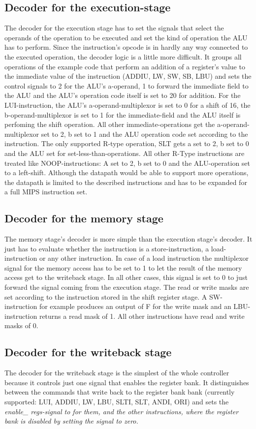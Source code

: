 \subsection{Decoder for the execution-stage}
The decoder for the execution stage has to set the signals that select the operands of the operation to be executed and set the kind of operation the ALU has to perform. Since the instruction's opcode is in hardly any way connected to the executed operation, the decoder logic is a little more difficult. It groups all operations of the example code that perform an addition of a register's value to the immediate value of the instruction (ADDIU, LW, SW, SB, LBU) and sets the control signals to 2 for the ALU's a-operand, 1 to forward the immediate field to the ALU and the ALU's operation code itself is set to 20 for addition. For the LUI-instruction, the ALU's a-operand-multiplexor is set to 0 for a shift of 16, the b-operand-multiplexor is set to 1 for the immediate-field and the ALU itself is perfoming the shift operation. All other immediate-operations get the a-operand-multiplexor set to 2, b set to 1 and the ALU operation code set according to the instruction. The only supported R-type operation, SLT gets a set to 2, b set to 0 and the ALU set for set-less-than-operations. All other R-Type instructions are treated like NOOP-instructions: A set to 2, b set to 0 and the ALU-operation set to a left-shift. Although the datapath would be able to support more operations, the datapath is limited to the described instructions and has to be expanded for a full MIPS instruction set.
\subsection{Decoder for the memory stage}
The memory stage's decoder is more simple than the execution stage's decoder. It just has to evaluate whether the instruction is a store-instruction, a load-instruction or any other instruction. In case of a load instruction the multiplexor signal for the memory access has to be set to 1 to let the result of the memory access get to the writeback stage. In all other cases, this signal is set to 0 to just forward the signal coming from the execution stage. The read or write masks are set according to the instruction stored in the shift register stage. A SW-instruction for example produces an output of F for the write mask and an LBU-instruction returns a read mask of 1. All other instructions have read and write masks of 0.
\subsection{Decoder for the writeback stage}
The decoder for the writeback stage is the simplest of the whole controller because it controls just one signal that enables the register bank. It distinguishes between the commands that write back to the register bank bank (currently supported: LUI, ADDIU, LW, LBU, SLTI, SLT, ANDI, ORI) and sets the \em enable\_ regs\em -signal to for them, and the other instructions, where the register bank is disabled by setting the signal to zero. 